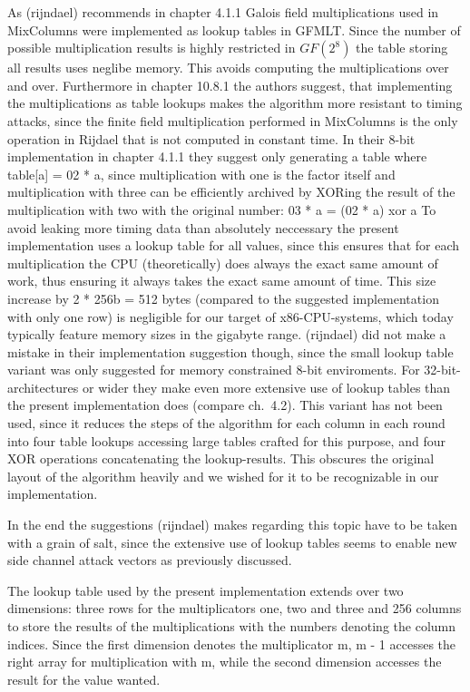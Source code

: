 As (rijndael) recommends in chapter 4.1.1 Galois field multiplications
used in MixColumns were implemented as lookup tables in GFMLT. Since the
number of possible multiplication results is highly restricted in $GF(2^{8})$
the table storing all results uses neglibe memory. This avoids computing
the multiplications over and over. Furthermore in chapter 10.8.1 the
authors suggest, that implementing the multiplications as table lookups
makes the algorithm more resistant to timing attacks, since the finite
field multiplication performed in MixColumns is the only operation in
Rijdael that is not computed in constant time. In their 8-bit
implementation in chapter 4.1.1 they suggest only generating a table
where table{[}a{]} = 02 * a, since multiplication with one is the factor
itself and multiplication with three can be efficiently archived by
XORing the result of the multiplication with two with the original
number: 03 * a = (02 * a) xor a To avoid leaking more timing data than
absolutely neccessary the present implementation uses a lookup table for
all values, since this ensures that for each multiplication the CPU
(theoretically) does always the exact same amount of work, thus ensuring
it always takes the exact same amount of time. This size increase by 2 *
256b = 512 bytes (compared to the suggested implementation with only one
row) is negligible for our target of x86-CPU-systems, which today
typically feature memory sizes in the gigabyte range. (rijndael) did not
make a mistake in their implementation suggestion though, since the
small lookup table variant was only suggested for memory constrained
8-bit enviroments. For 32-bit-architectures or wider they make even more
extensive use of lookup tables than the present implementation does
(compare ch.~4.2). This variant has not been used, since it reduces the
steps of the algorithm for each column in each round into four table
lookups accessing large tables crafted for this purpose, and four XOR
operations concatenating the lookup-results. This obscures the original
layout of the algorithm heavily and we wished for it to be recognizable
in our implementation.

In the end the suggestions (rijndael) makes regarding this topic have to
be taken with a grain of salt, since the extensive use of lookup tables
seems to enable new side channel attack vectors as previously discussed.

The lookup table used by the present implementation extends over two
dimensions: three rows for the multiplicators one, two and three and 256
columns to store the results of the multiplications with the numbers
denoting the column indices. Since the first dimension denotes the
multiplicator m, m - 1 accesses the right array for multiplication with
m, while the second dimension accesses the result for the value wanted.

